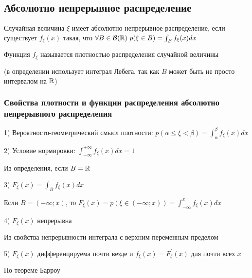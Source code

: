 \documentclass[12pt]{article}
\begin{document}
    \hypertarget{continuousdistributionproperties}{}

    \subsection{Абсолютно непрерывное распределение}

    \Def Случайная величина $\xi$ имеет абсолютно непрерывное распределение, если существует $f_\xi(x)$ такая, что $\forall B \in \mathcal{B}(\mathbb{R})
    \ p(\xi \in B) = \int_B f_\xi(x)dx$

    \hypertarget{densityfunctiondefinition}{}

    Функция $f_\xi$ называется плотностью распределения случайной величины

    (в определении использует интеграл Лебега, так как $B$ может быть не просто интервалом на $\mathbb{R}$)

    \hypertarget{densityfunctionproperties}{}

    \subsubsection{Свойства плотности и функции распределения абсолютно непрерывного распределения}

    1) Вероятносто-геометрический смысл плотности: $p(\alpha \leq \xi < \beta) = \int_{\alpha}^\beta f_\xi(x) dx$

    2) Условие нормировки: $\int_{-\infty}^{+\infty} f_\xi(x)dx = 1$

    \begin{MyProof}
        Из определения, если $B = \mathbb{R}$
    \end{MyProof}

    3) $F_\xi(x) = \int_B f_\xi(x)dx$

    \begin{MyProof}
        Если $B = (-\infty; x)$, то $F_\xi(x) = p(\xi \in (-\infty; x)) = \int_{-\infty}^x f_\xi(x)dx$
    \end{MyProof}

    4) $F_\xi(x)$ непрерывна 
    
    \begin{MyProof}
        Из свойства непрерывности интеграла с верхним переменным пределом
    \end{MyProof}

    5) $F_\xi(x)$ дифференцируема почти везде и $f_\xi(x) = F^\prime_\xi(x)$ для почти всех $x$
    
    \begin{MyProof}
        По теореме Барроу
    \end{MyProof}
\end{document}
